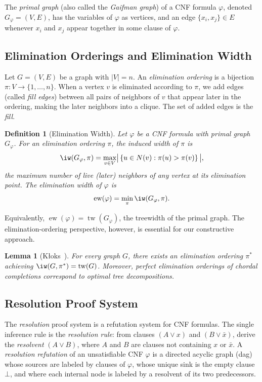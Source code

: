 \documentclass[11pt]{article}
\newtheorem{lemma}[theorem]{Lemma}
\newtheorem{definition}[theorem]{Definition}
\DeclareMathOperator{\tw}{tw}
\DeclareMathOperator{\ew}{ew}
\begin{document}
The \emph{primal graph} (also called the \emph{Gaifman graph}) of a CNF formula $\varphi$, denoted $G_\varphi = (V, E)$, has the variables of $\varphi$ as vertices, and an edge $\{x_i, x_j\} \in E$ whenever $x_i$ and $x_j$ appear together in some clause of $\varphi$.

\subsection{Elimination Orderings and Elimination Width}

Let $G = (V, E)$ be a graph with $|V| = n$. An \emph{elimination ordering} is a bijection $\pi: V \to \{1, \ldots, n\}$. When a vertex $v$ is eliminated according to $\pi$, we add edges (called \emph{fill edges}) between all pairs of neighbors of $v$ that appear later in the ordering, making the later neighbors into a clique. The set of added edges is the \emph{fill}.

\begin{definition}[Elimination Width]
\label{def:ew}
Let $\varphi$ be a CNF formula with primal graph $G_\varphi$. For an elimination ordering $\pi$, the \emph{induced width} of $\pi$ is
\[
\iw(G_\varphi, \pi) = \max_{v \in V} \bigl|\, \{u \in N(v) : \pi(u) > \pi(v)\} \,\bigr|,
\]
the maximum number of \emph{live} (later) neighbors of any vertex at its elimination point. The \emph{elimination width} of $\varphi$ is
\[
\ew(\varphi) = \min_{\pi} \iw(G_\varphi, \pi).
\]
\end{definition}

Equivalently, $\ew(\varphi) = \tw(G_\varphi)$, the treewidth of the primal graph. The elimination-ordering perspective, however, is essential for our constructive approach.

\begin{lemma}[{K\l oks~\cite{kloks1994treewidth}}]
\label{lem:elim-optimal}
For every graph $G$, there exists an elimination ordering $\pi^*$ achieving $\iw(G, \pi^*) = \tw(G)$. Moreover, perfect elimination orderings of chordal completions correspond to optimal tree decompositions.
\end{lemma}

\subsection{Resolution Proof System}

The \emph{resolution} proof system is a refutation system for CNF formulas. The single inference rule is the \emph{resolution rule}: from clauses $(A \lor x)$ and $(B \lor \bar{x})$, derive the \emph{resolvent} $(A \lor B)$, where $A$ and $B$ are clauses not containing $x$ or $\bar{x}$. A \emph{resolution refutation} of an unsatisfiable CNF $\varphi$ is a directed acyclic graph (dag) whose sources are labeled by clauses of $\varphi$, whose unique sink is the empty clause $\bot$, and where each internal node is labeled by a resolvent of its two predecessors.
\end{document}
